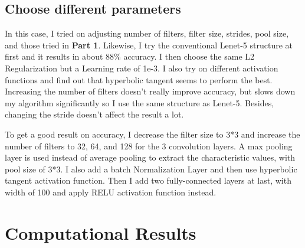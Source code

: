 \documentclass[10pt]{article}
\begin{document}
\subsection*{Choose different parameters}
In this case, I tried on adjusting number of filters, filter size, strides, pool size, and those tried in \textbf{Part 1}. Likewise, I try the conventional Lenet-5 structure at first and it results in about 88$\%$ accuracy. I then choose the same L2 Regularization but a Learning rate of 1e-3. I also try on different activation functions and find out that hyperbolic tangent seems to perform the best. Increasing the number of filters doesn't really improve accuracy, but slows down my algorithm significantly so I use the same structure as Lenet-5. Besides, changing the stride doesn't affect the result a lot.
\par
\vskip 0.2cm
To get a good result on accuracy, I decrease the filter size to 3*3 and increase the number of filters to 32, 64, and 128 for the 3 convolution layers. A max pooling layer is used instead of average pooling to extract the characteristic values, with pool size of 3*3. I also add a batch Normalization Layer and then use hyperbolic tangent activation function. Then I add two fully-connected layers at last, with width of 100 and apply RELU activation function instead.



\section{Computational Results}
\end{document}
